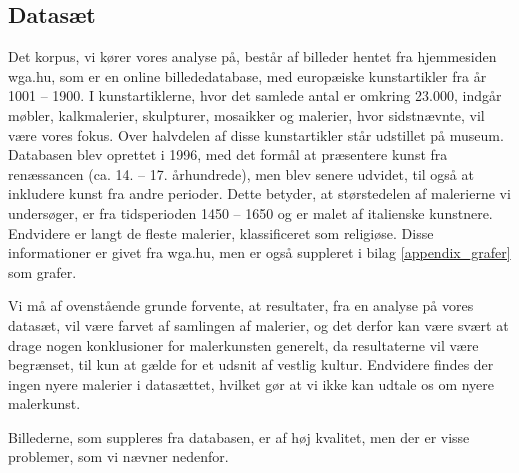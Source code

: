 {\subsection{Datasæt}
Det korpus, vi kører vores analyse på, består af billeder hentet fra
hjemmesiden wga.hu\cite{wgahu}, som er en online billededatabase, med
europæiske kunstartikler fra år 1001 -- 1900. I kunstartiklerne, hvor
det samlede antal er omkring 23.000, indgår møbler, kalkmalerier,
skulpturer, mosaikker og malerier, hvor sidstnævnte, vil være vores
fokus. Over halvdelen af disse kunstartikler står udstillet på museum.
Databasen blev oprettet i 1996, med det formål at præsentere kunst fra
renæssancen (ca.  14. -- 17.  århundrede), men blev senere udvidet, til
også at inkludere kunst fra andre perioder. Dette betyder, at
størstedelen af malerierne vi undersøger, er fra tidsperioden 1450 --
1650 og er malet af italienske kunstnere. Endvidere er langt de fleste
malerier, klassificeret som religiøse.  Disse informationer er givet fra
wga.hu, men er også suppleret i bilag \ref{appendix_grafer} som
grafer.

Vi må af ovenstående grunde forvente, at resultater, fra en analyse på
vores datasæt, vil være farvet af samlingen af malerier, og det derfor
kan være svært at drage nogen konklusioner for malerkunsten generelt, da
resultaterne vil være begrænset, til kun at gælde for et udsnit af
vestlig kultur. Endvidere findes der ingen nyere malerier i datasættet,
hvilket gør at vi ikke kan udtale os om nyere malerkunst.

Billederne, som suppleres fra databasen, er af høj kvalitet, men der er
visse problemer, som vi nævner nedenfor.

}
